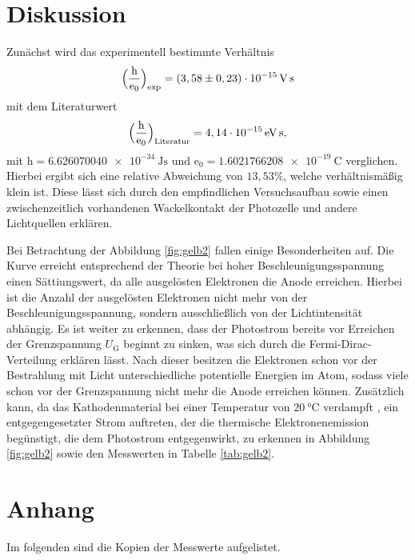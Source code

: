 \section{Diskussion}
\label{sec:Diskussion}

Zunächst wird das experimentell bestimmte Verhältnis 
\begin{align*}
\Bigl(\frac{\mathrm{h}}{\mathrm{e_0}}\Bigr)_\text{exp} = (3,58 \pm 0,23)\cdot 10^{-15}\,\si{\volt\second} 
\end{align*}
mit dem Literaturwert 
\begin{align*}
\Bigl(\frac{\mathrm{h}}{\mathrm{e_0}}\Bigr)_\text{Literatur} = 4,14 \cdot 10^{-15}\,\si{\eV\second}, 
\end{align*}
mit $\mathrm{h} = \SI{6.626070040e-34}{\joule\second}$ \cite{h} und $\mathrm{e_0} = \SI{1.6021766208e-19}{\coulomb}$ \cite{e} verglichen.
Hierbei ergibt sich eine relative Abweichung von $13,53\%$, welche verhältnismäßig klein ist.
Diese lässt sich durch den empfindlichen Versuchsaufbau sowie einen zwischenzeitlich vorhandenen
Wackelkontakt der Photozelle und andere Lichtquellen erklären.

\noindent Bei Betrachtung der Abbildung \ref{fig:gelb2} fallen einige Besonderheiten auf.
Die Kurve erreicht entsprechend der Theorie bei hoher Beschleunigungsspannung einen Sättiungswert,
da alle ausgelösten Elektronen die Anode erreichen. Hierbei ist die Anzahl der ausgelösten Elektronen
nicht mehr von der Beschleunigungsspannung, sondern ausschließlich von der Lichtintensität abhängig.
Es ist weiter zu erkennen, dass der Photostrom bereits vor Erreichen der Grenzspannung $U_\text{G}$
beginnt zu sinken, was sich durch die Fermi-Dirac-Verteilung erklären lässt. Nach dieser besitzen die
Elektronen schon vor der Bestrahlung mit Licht unterschiedliche potentielle Energien im Atom, sodass viele
schon vor der Grenzspannung nicht mehr die Anode erreichen können. Zusätzlich kann, da das 
Kathodenmaterial bei einer Temperatur von $\SI{20}{\celsius}$
verdampft \cite{kent}, ein entgegengesetzter Strom auftreten, 
der die thermische Elektronenemission begünstigt, die dem Photostrom entgegenwirkt, zu erkennen in Abbildung \ref{fig:gelb2}
sowie den Messwerten in Tabelle \ref{tab:gelb2}.

\section{Anhang}
\label{Anhang}
Im folgenden sind die Kopien der Messwerte aufgelistet.

